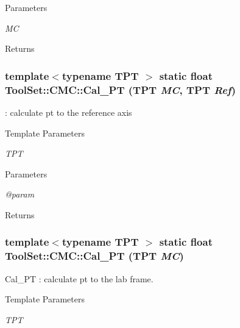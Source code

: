 \begin{DoxyParams}{Parameters}
\item[{\em MC}]\end{DoxyParams}
\begin{DoxyReturn}{Returns}

\end{DoxyReturn}
\hypertarget{classToolSet_1_1CMC_a8c4c04395c95a6c513f049029c157a7d}{
\subsubsection[{Cal\_\-PT}]{\setlength{\rightskip}{0pt plus 5cm}template$<$typename TPT $>$ static float ToolSet::CMC::Cal\_\-PT (TPT {\em MC}, \/  TPT {\em Ref})}}
\label{classToolSet_1_1CMC_a8c4c04395c95a6c513f049029c157a7d}


: calculate pt to the reference axis 
\begin{DoxyTemplParams}{Template Parameters}
\item[{\em TPT}]\end{DoxyTemplParams}

\begin{DoxyParams}{Parameters}
\item[{\em @param}]\end{DoxyParams}
\begin{DoxyReturn}{Returns}

\end{DoxyReturn}
\hypertarget{classToolSet_1_1CMC_ac479ce63e1328c284ef104449b30d465}{
\subsubsection[{Cal\_\-PT}]{\setlength{\rightskip}{0pt plus 5cm}template$<$typename TPT $>$ static float ToolSet::CMC::Cal\_\-PT (TPT {\em MC})}}
\label{classToolSet_1_1CMC_ac479ce63e1328c284ef104449b30d465}


Cal\_\-PT : calculate pt to the lab frame. 
\begin{DoxyTemplParams}{Template Parameters}
\item[{\em TPT}]\end{DoxyTemplParams}

